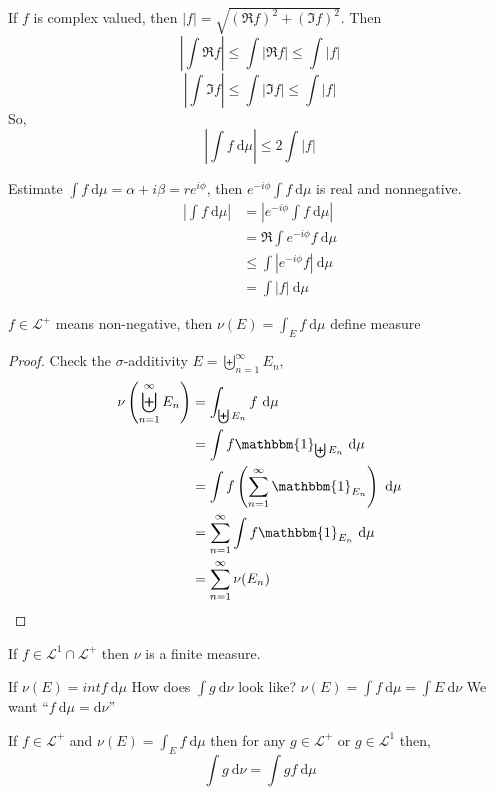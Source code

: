 \begin{remark}
  If $f$ is complex valued, then $|f| = \sqrt{(\Re f)^2 + (\Im f)^2}$.
  Then
  \[\left|\int \Re f \right|\le \int |\Re f| \le \int |f|\]
  \[\left|\int \Im f \right|\le \int |\Im f| \le \int |f|\]
  So, 
  \[\left|\int f\ \mathrm{d}\mu \right| \le 2\int |f|\]
\end{remark}

\begin{remark}
  Estimate $\int f \ \mathrm{d}\mu = \alpha + i\beta = re^{i \phi}$, then
  $e^{-i\phi} \int f \ \mathrm{d}\mu$ is real and nonnegative.
  \begin{align*}
    \left|\int f \ \mathrm{d}\mu\right| &= \left|e^{-i\phi} \int f \ \mathrm{d}\mu\right| \\
    &= \Re \int e^{-i\phi}f \ \mathrm{d}\mu \\
    &\le \int |e^{-i\phi}f| \ \mathrm{d}\mu \\
    &= \int |f| \ \mathrm{d}\mu
  \end{align*}
\end{remark}

\begin{lemma}
$f \in \mathcal{L}^+$ means non-negative, then $\nu(E) = \int_E f \ \mathrm{d}\mu$ define measure
\end{lemma}

\begin{proof}
Check the $\sigma$-additivity
$E = \biguplus_{n=1}^\infty E_n$, 
\begin{align*}
  \nu\left(\biguplus_{n=1}^\infty E_n\right) &= \int_{\biguplus E_n} f \ \mathrm{d}\mu \\
  &= \int f \mathbbm{1}_{\biguplus E_n} \ \mathrm{d}\mu \\
  &= \int f \left(\sum_{n=1}^\infty \mathbbm{1}_{E_n}\right) \ \mathrm{d}\mu \\
  &= \sum_{n=1}^\infty \int f \mathbbm{1}_{E_n} \ \mathrm{d}\mu \\
  &= \sum_{n=1}^\infty \nu(E_n)
\end{align*}
\end{proof}

\begin{claim}
  If $f \in \mathcal{L}^1 \cap \mathcal{L}^+$ then $\nu$ is a finite measure.
\end{claim}

If $\nu(E) = int f  \ \mathrm{d}\mu$
How does $\int g \ \mathrm{d}\nu$ look like?
$\nu(E) = \int f \ \mathrm{d}\mu = \int E \ \mathrm{d}\nu$
We want ``$f\ \mathrm{d}\mu = \mathrm{d}\nu$''
\begin{lemma}
  If $f \in \mathcal{L}^+$ and $\nu(E) = \int_E f \ \mathrm{d}\mu$ then for any $g \in \mathcal{L}^+$ or $g \in \mathcal{L}^1$ then,   
  \[\int g\ \mathrm{d}\nu = \int g f \ \mathrm{d}\mu\]
\end{lemma}

